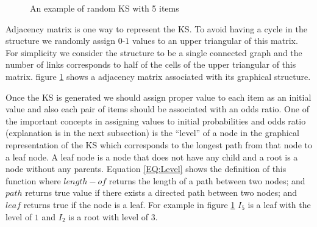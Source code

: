 
\begin{figure}[t]
\centering 
{}
\qquad
\qquad
{}

\caption{An example of random KS with 5 items}
\label{fig:KSExample}
\end{figure}

Adjacency matrix  is one way to represent the KS. To avoid having a cycle in the structure we randomly assign $0$-$1$ values to an upper triangular of this matrix. For simplicity we consider the structure to be a single connected graph and the number of links corresponds to half of the cells of the upper triangular of this matrix. figure \ref{fig:KSExample} shows a adjacency matrix associated with its graphical structure. 

Once the KS is generated we should assign proper value to each item as an initial value and also each pair of items should be associated with an odds ratio. One of the important concepts in assigning values to initial probabilities and odds ratio (explanation is in the next subsection) is the ``level'' of a node in the graphical representation of the KS which corresponds to the longest path from that node to a leaf node. A leaf node is a node that does not have any child and a root is a node without any parents. Equation \ref{EQ:Level} shows the definition of this function where $length-of$ returns the length of a path between two nodes; and $path$ returns true value if there exists a directed path between two nodes; and $leaf$ returns true if the node is a leaf.  For example in figure \ref{fig:KSExample} $I_{5}$ is a leaf with the level of $1$ and $I_{2}$ is a root with level of $3$.

